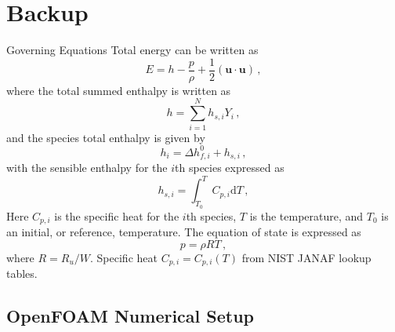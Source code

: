 \section{Backup}

\begin{frame}[allowframebreaks]{Governing Equations}
Total energy \cite{kuo} can be written as 
\begin{equation}
E = h - \frac{p}{\rho} +\frac{1}{2} \left(\bm{u}\cdot\bm{u}\right)\,,
\end{equation}
where the total summed enthalpy is written \cite{kuo} as 
\begin{equation}
h = \sum_{i = 1}^Nh_{s,i}Y_i\,,
\end{equation}
and the species total enthalpy \cite{kuo} is given by 
\begin{equation}
h_{i} = \Delta h_{f,i}^0 + h_{s,i}\,,
\end{equation}
with the sensible enthalpy for the $i$th species expressed as
\begin{equation}
h_{s,i} = \int_{T_0}^T C_{p,i}\mathrm{d}T\,,
\end{equation}
Here $C_{p,i}$ is the specific heat for the $i$th species, $T$ is the temperature, and $T_0$ is an initial, or reference, temperature. The equation of state is expressed as 
\begin{equation}
p = \rho R T\,,
\end{equation}
where $R=R_u/W$. Specific heat $C_{p,i}=C_{p,i}(T)$ from NIST JANAF \cite{janaf} lookup tables.  
\end{frame}


\subsection{OpenFOAM Numerical Setup}

